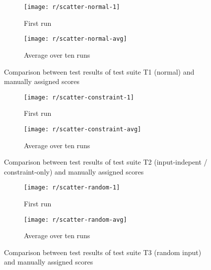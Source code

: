 \begin{figure}[htpb]
    \centering
    \begin{subfigure}{.85\textwidth}
        \texttt{[image: r/scatter-normal-1]}
        \caption{First run}
        \label{fig:scatter_normal_1}
    \end{subfigure}

    \bigskip

    \begin{subfigure}{.85\textwidth}
        \texttt{[image: r/scatter-normal-avg]}
        \caption{Average over ten runs}
        \label{fig:scatter_normal_avg}
    \end{subfigure}
    \caption{Comparison between test results of test suite T1 (normal) and manually assigned scores}
    \label{fig:scatter_normal}
\end{figure}

\begin{figure}[htpb]
    \centering
    \begin{subfigure}{.85\textwidth}
        \texttt{[image: r/scatter-constraint-1]}
        \caption{First run}
        \label{fig:scatter_constraint_1}
    \end{subfigure}

    \bigskip

    \begin{subfigure}{.85\textwidth}
        \texttt{[image: r/scatter-constraint-avg]}
        \caption{Average over ten runs}
        \label{fig:scatter_constraint_avg}
    \end{subfigure}
    \caption{Comparison between test results of test suite T2 (input-indepent / constraint-only) and manually assigned scores}
    \label{fig:scatter_constraint}
\end{figure}

\begin{figure}[htpb]
    \centering
    \begin{subfigure}{.85\textwidth}
        \texttt{[image: r/scatter-random-1]}
        \caption{First run}
        \label{fig:scatter_random_1}
    \end{subfigure}

    \bigskip

    \begin{subfigure}{.85\textwidth}
        \texttt{[image: r/scatter-random-avg]}
        \caption{Average over ten runs}
        \label{fig:scatter_random_avg}
    \end{subfigure}
    \caption{Comparison between test results of test suite T3 (random input) and manually assigned scores}
    \label{fig:scatter_random}
\end{figure}

